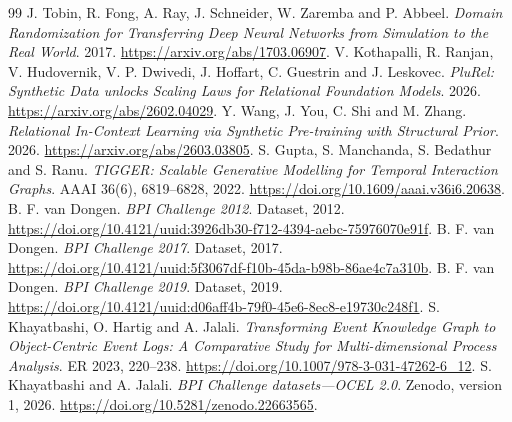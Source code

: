 \documentclass[11pt]{article}
\begin{document}
\begin{thebibliography}{99}
 J. Tobin, R. Fong, A. Ray, J. Schneider, W. Zaremba and P. Abbeel. \emph{Domain Randomization for Transferring Deep Neural Networks from Simulation to the Real World}. 2017. \url{https://arxiv.org/abs/1703.06907}.
 V. Kothapalli, R. Ranjan, V. Hudovernik, V. P. Dwivedi, J. Hoffart, C. Guestrin and J. Leskovec. \emph{PluRel: Synthetic Data unlocks Scaling Laws for Relational Foundation Models}. 2026. \url{https://arxiv.org/abs/2602.04029}.
 Y. Wang, J. You, C. Shi and M. Zhang. \emph{Relational In-Context Learning via Synthetic Pre-training with Structural Prior}. 2026. \url{https://arxiv.org/abs/2603.03805}.
 S. Gupta, S. Manchanda, S. Bedathur and S. Ranu. \emph{TIGGER: Scalable Generative Modelling for Temporal Interaction Graphs}. AAAI 36(6), 6819--6828, 2022. \url{https://doi.org/10.1609/aaai.v36i6.20638}.
 B. F. van Dongen. \emph{BPI Challenge 2012}. Dataset, 2012. \url{https://doi.org/10.4121/uuid:3926db30-f712-4394-aebc-75976070e91f}.
 B. F. van Dongen. \emph{BPI Challenge 2017}. Dataset, 2017. \url{https://doi.org/10.4121/uuid:5f3067df-f10b-45da-b98b-86ae4c7a310b}.
 B. F. van Dongen. \emph{BPI Challenge 2019}. Dataset, 2019. \url{https://doi.org/10.4121/uuid:d06aff4b-79f0-45e6-8ec8-e19730c248f1}.
 S. Khayatbashi, O. Hartig and A. Jalali. \emph{Transforming Event Knowledge Graph to Object-Centric Event Logs: A Comparative Study for Multi-dimensional Process Analysis}. ER 2023, 220--238. \url{https://doi.org/10.1007/978-3-031-47262-6_12}.
 S. Khayatbashi and A. Jalali. \emph{BPI Challenge datasets---OCEL 2.0}. Zenodo, version 1, 2026. \url{https://doi.org/10.5281/zenodo.22663565}.
\end{thebibliography}
\end{document}
